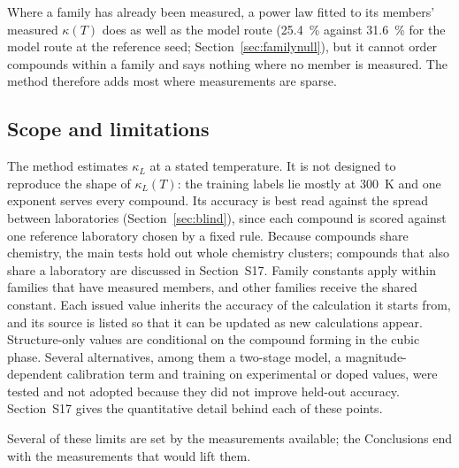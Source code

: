 Where a family has already been measured, a power law fitted to its members' measured $\kappa(T)$
does as well as the model route (\SI{25.4}{\percent} against \SI{31.6}{\percent} for the model
route at the reference seed; Section~\ref{sec:familynull}), but it cannot order compounds within a
family and says nothing where no member is measured. The method therefore adds most where
measurements are sparse.

\subsection{Scope and limitations}
\label{sec:limitations}

The method estimates $\kappa_L$ at a stated temperature. It is not designed to reproduce the shape of
$\kappa_L(T)$: the training labels lie mostly at \SI{300}{\kelvin} and one exponent serves every
compound. Its accuracy is best read against the spread between laboratories (Section~\ref{sec:blind}),
since each compound is scored against one reference laboratory chosen by a fixed rule. Because
compounds share chemistry, the main tests hold out whole chemistry clusters; compounds that also
share a laboratory are discussed in Section~S17. Family constants
apply within families that have measured members, and other families receive the shared constant.
Each issued value inherits the accuracy of the calculation it starts from, and its source is listed so
that it can be updated as new calculations appear. Structure-only values are conditional on the compound forming in the cubic phase. Several alternatives, among them a
two-stage model, a magnitude-dependent calibration term and training on experimental or doped values,
were tested and not adopted because they did not improve held-out accuracy. Section~S17 gives the
quantitative detail behind each of these points.

Several of these limits are set by the measurements available; the Conclusions end with the
measurements that would lift them.
